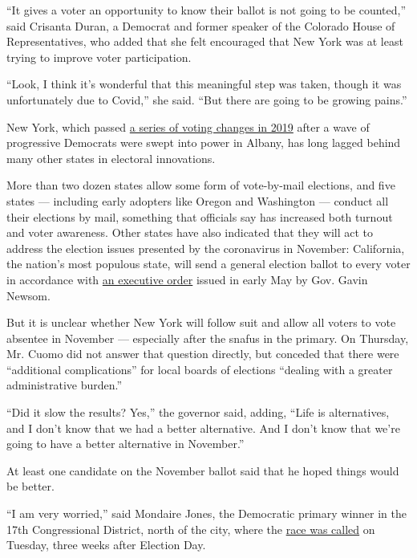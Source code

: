 ``It gives a voter an opportunity to know their ballot is not going to
be counted,'' said Crisanta Duran, a Democrat and former speaker of the
Colorado House of Representatives, who added that she felt encouraged
that New York was at least trying to improve voter participation.

``Look, I think it's wonderful that this meaningful step was taken,
though it was unfortunately due to Covid,'' she said. ``But there are
going to be growing pains.''

New York, which passed
\href{https://www.nytimes3xbfgragh.onion/2019/01/10/nyregion/voting-reform-election-ny.html}{a
series of voting changes in 2019} after a wave of progressive Democrats
were swept into power in Albany, has long lagged behind many other
states in electoral innovations.

More than two dozen states allow some form of vote-by-mail elections,
and five states --- including early adopters like Oregon and Washington
--- conduct all their elections by mail, something that officials say
has increased both turnout and voter awareness. Other states have also
indicated that they will act to address the election issues presented by
the coronavirus in November: California, the nation's most populous
state, will send a general election ballot to every voter in accordance
with
\href{https://www.gov.ca.gov/wp-content/uploads/2020/05/05.08.2020-EO-N-64-20-signed.pdf}{an
executive order} issued in early May by Gov. Gavin Newsom.

But it is unclear whether New York will follow suit and allow all voters
to vote absentee in November --- especially after the snafus in the
primary. On Thursday, Mr. Cuomo did not answer that question directly,
but conceded that there were ``additional complications'' for local
boards of elections ``dealing with a greater administrative burden.''

``Did it slow the results? Yes,'' the governor said, adding, ``Life is
alternatives, and I don't know that we had a better alternative. And I
don't know that we're going to have a better alternative in November.''

At least one candidate on the November ballot said that he hoped things
would be better.

``I am very worried,'' said Mondaire Jones, the Democratic primary
winner in the 17th Congressional District, north of the city, where the
\href{https://www.nytimes3xbfgragh.onion/2020/07/14/nyregion/mondaire-jones-house-primary.html}{race
was called} on Tuesday, three weeks after Election Day.

